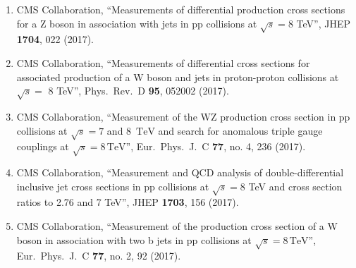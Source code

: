 \begin{enumerate}
\item CMS Collaboration, ``Measurements of differential production cross sections for a Z boson in association with jets in pp collisions at $ \sqrt{s}=8 $ TeV'', JHEP {\bf 1704}, 022 (2017).

\item CMS Collaboration, ``Measurements of differential cross sections for associated production of a W boson and jets in proton-proton collisions at $\sqrt{s} =$ 8 TeV'', Phys.\ Rev.\ D {\bf 95}, 052002 (2017).

\item CMS Collaboration, ``Measurement of the WZ production cross section in pp collisions at $\sqrt{s} = 7$ and 8 $\,\text{TeV}$ and search for anomalous triple gauge couplings at $\sqrt{s} = 8\,\text{TeV} $'', Eur.\ Phys.\ J.\ C {\bf 77}, no. 4, 236 (2017).

\item CMS Collaboration, ``Measurement and QCD analysis of double-differential inclusive jet cross sections in pp collisions at $ \sqrt{s}=8 $ TeV and cross section ratios to 2.76 and 7 TeV'', JHEP {\bf 1703}, 156 (2017).

\item CMS Collaboration, ``Measurement of the production cross section of a W boson in association with two b jets in pp collisions at $\sqrt{s} = 8{\,\mathrm{{TeV}}} $'', Eur.\ Phys.\ J.\ C {\bf 77}, no. 2, 92 (2017).


\end{enumerate}
